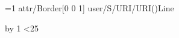  
\vsize=100pt \parskip=0pt \baselineskip=12pt
\def\l#1{\leavevmode\pdfstartlink attr{/Border[0 0 1]} user{/S/URI/URI(#1)}Line #1\pdfendlink
  \immediate{}\pdfrefobj\pdflastobj\par}
=1
\loop \l{\the\count1}\advance{} by 1 \ifnum{}<25 \repeat
\bye

